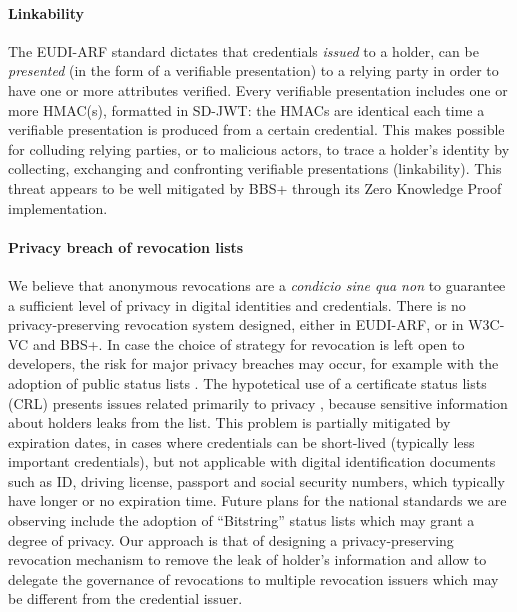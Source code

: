 \paragraph{Linkability}

The EUDI-ARF standard dictates that credentials \textit{issued} to a
holder, can be \textit{presented} (in the form of a verifiable
presentation) to a relying party in order to have one or more
attributes verified. Every verifiable presentation includes one or
more HMAC(s), formatted in SD-JWT: the HMACs are identical each time a
verifiable presentation is produced from a certain credential. This
makes possible for colluding relying parties, or to malicious actors,
to trace a holder's identity by collecting, exchanging and confronting
verifiable presentations (linkability). This threat appears to be well
mitigated by BBS+ through its Zero Knowledge Proof implementation.

\paragraph{Privacy breach of revocation lists}

We believe that anonymous revocations are a \textit{condicio sine qua
  non} to guarantee a sufficient level of privacy in digital
identities and credentials. There is no privacy-preserving revocation
system designed, either in EUDI-ARF, or in W3C-VC and BBS+. In case
the choice of strategy for revocation is left open to developers, the
risk for major privacy breaches may occur, for example with the
adoption of public status lists \cite{crlcomparison}. The hypotetical
use of a certificate status lists (CRL) presents issues related
primarily to privacy \cite{CRL}, because sensitive information about
holders leaks from the list. This problem is partially mitigated by
expiration dates, in cases where credentials can be short-lived
(typically less important credentials), but not applicable with
digital identification documents such as ID, driving license, passport
and social security numbers, which typically have longer or no
expiration time. Future plans for the national standards we are
observing include the adoption of ``Bitstring'' status lists
\cite{status-lists} which may grant a degree of privacy. Our approach
is that of designing a privacy-preserving revocation mechanism to
remove the leak of holder's information and allow to delegate the
governance of revocations to multiple revocation issuers which may be
different from the credential issuer.

